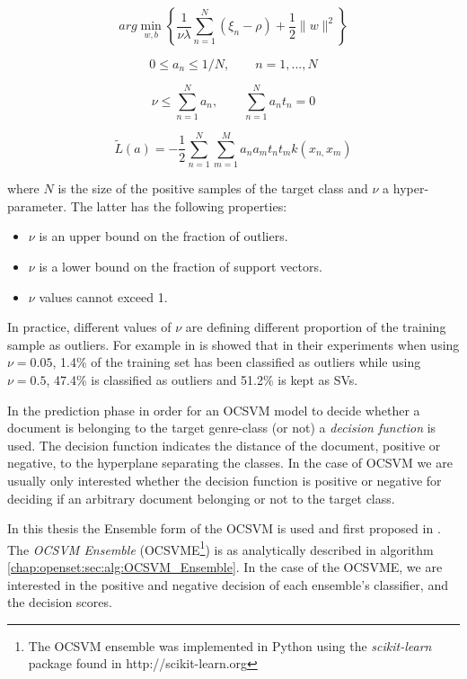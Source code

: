 \begin{equation}\label{chap:openset:sec:eq:3}
	arg\min_{w,b}\left\{ \frac{1}{\nu\lambda}\sum_{n=1}^{N}(\xi_{n}-\rho)+\frac{1}{2}\|w\|^{2}\right\}
\end{equation}

\begin{equation}\label{chap:openset:sec:eq:4}
	0\leqslant a_{n}\leqslant1/N,\qquad n=1,...,N
\end{equation}

\begin{equation}\label{chap:openset:sec:eq:5}
	\nu\leqslant\sum_{n=1}^{N}a_{n}, \qquad \sum_{n=1}^{N}a_{n}t_{n}=0
\end{equation}

\begin{equation}\label{chap:openset:sec:eq:12}
	\widetilde{L}(a)=-\frac{1}{2}\sum_{n=1}^{N}\sum_{m=1}^{M}a_{n}a_{m}t_{n}t_{m}k(x_{n,}x_{m})
\end{equation}

\nointend where $N$ is the size of the positive samples of the target class and $\nu$ a hyper-parameter. The latter has the following properties:

\begin{itemize}
	\item $\nu$ is an upper bound on the fraction of outliers.
	\item $\nu$ is a lower bound on the fraction of support vectors.
	\item $\nu$ values cannot exceed 1.
\end{itemize}

In practice, different values of $\nu$ are defining different proportion of the training sample as outliers. For example in \parencite{scholkopf1999estimating} is showed that in their experiments when using $\nu=0.05$, 1.4\% of the training set has been classified as outliers while using $\nu=0.5$, 47.4\% is classified as outliers and 51.2\% is kept as SVs.

In the prediction phase in order for an OCSVM model to decide whether a document is belonging to the target genre-class (or not) a \textit{decision function} is used. The decision function indicates the distance of the document, positive or negative, to the hyperplane separating the classes. In the case of OCSVM we are usually only interested whether the decision function is positive or negative for deciding if an arbitrary document belonging or not to the target class.

In this thesis the Ensemble form of the OCSVM is used and first proposed in \parencite{pritsos2013open}. The \textit{OCSVM Ensemble} (OCSVME\footnote{The OCSVM ensemble was implemented in Python using the \textit{scikit-learn} package found in http://scikit-learn.org}) is as analytically described in algorithm \ref{chap:openset:sec:alg:OCSVM_Ensemble}. In the case of the OCSVME, we are interested in the positive and negative decision of each ensemble's classifier, and the decision scores.

